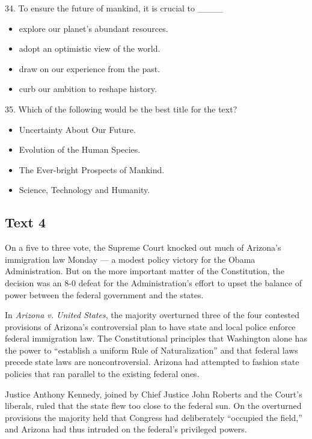\documentclass[UTF8,11pt]{ctexart}
\begin{document}
34. To ensure the future of mankind, it is crucial to \_\_\_\_


\begin{itemize}[leftmargin=2em,itemsep=.2em,topsep=.4em]\item[A.] explore our planet’s abundant resources.
\item[B.] adopt an optimistic view of the world.
\item[C.] draw on our experience from the past.
\item[D.] curb our ambition to reshape history.
\end{itemize}

35. Which of the following would be the best title for the text?


\begin{itemize}[leftmargin=2em,itemsep=.2em,topsep=.4em]\item[A.] Uncertainty About Our Future.
\item[B.] Evolution of the Human Species.
\item[C.] The Ever-bright Prospects of Mankind.
\item[D.] Science, Technology and Humanity.
\end{itemize}

\subsection*{\textbf{Text 4}}


On a five to three vote, the Supreme Court knocked out much of Arizona’s immigration law Monday — a modest policy victory for the Obama Administration. But on the more important matter of the Constitution, the decision was an 8-0 defeat for the Administration’s effort to upset the balance of power between the federal government and the states.


In \textit{Arizona v. United States}, the majority overturned three of the four contested provisions of Arizona’s controversial plan to have state and local police enforce federal immigration law. The Constitutional principles that Washington alone has the power to “establish a uniform Rule of Naturalization” and that federal laws precede state laws are noncontroversial. Arizona had attempted to fashion state policies that ran parallel to the existing federal ones.


Justice Anthony Kennedy, joined by Chief Justice John Roberts and the Court’s liberals, ruled that the state flew too close to the federal sun. On the overturned provisions the majority held that Congress had deliberately “occupied the field,” and Arizona had thus intruded on the federal’s privileged powers.
\end{document}
